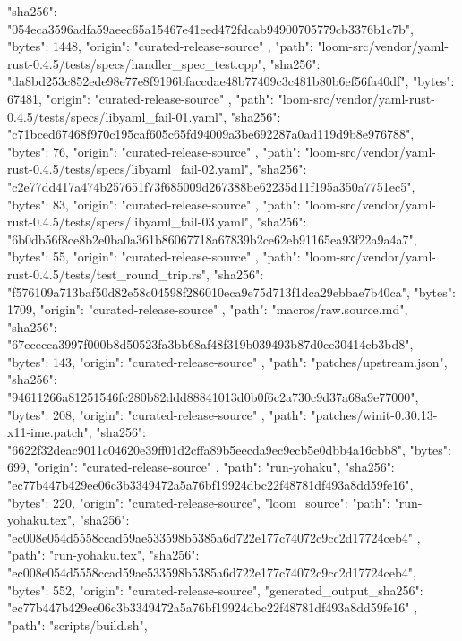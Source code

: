 {{      "sha256": "054eca3596adfa59aeec65a15467e41eed472fdcab94900705779cb3376b1c7b",
      "bytes": 1448,
      "origin": "curated-release-source"
    },
    {
      "path": "loom-src/vendor/yaml-rust-0.4.5/tests/specs/handler_spec_test.cpp",
      "sha256": "da8bd253c852ede98e77e8f9196bfaccdae48b77409c3c481b80b6ef56fa40df",
      "bytes": 67481,
      "origin": "curated-release-source"
    },
    {
      "path": "loom-src/vendor/yaml-rust-0.4.5/tests/specs/libyaml_fail-01.yaml",
      "sha256": "c71bced67468f970c195caf605c65fd94009a3be692287a0ad119d9b8e976788",
      "bytes": 76,
      "origin": "curated-release-source"
    },
    {
      "path": "loom-src/vendor/yaml-rust-0.4.5/tests/specs/libyaml_fail-02.yaml",
      "sha256": "c2e77dd417a474b257651f73f685009d267388be62235d11f195a350a7751ec5",
      "bytes": 83,
      "origin": "curated-release-source"
    },
    {
      "path": "loom-src/vendor/yaml-rust-0.4.5/tests/specs/libyaml_fail-03.yaml",
      "sha256": "6b0db56f8ce8b2e0ba0a361b86067718a67839b2ce62eb91165ea93f22a9a4a7",
      "bytes": 55,
      "origin": "curated-release-source"
    },
    {
      "path": "loom-src/vendor/yaml-rust-0.4.5/tests/test_round_trip.rs",
      "sha256": "f576109a713baf50d82e58c04598f286010eca9e75d713f1dca29ebbae7b40ca",
      "bytes": 1709,
      "origin": "curated-release-source"
    },
    {
      "path": "macros/raw.source.md",
      "sha256": "67ececca3997f000b8d50523fa3bb68af48f319b039493b87d0ce30414cb3bd8",
      "bytes": 143,
      "origin": "curated-release-source"
    },
    {
      "path": "patches/upstream.json",
      "sha256": "94611266a81251546fc280b82ddd88841013d0b0f6c2a730c9d37a68a9e77000",
      "bytes": 208,
      "origin": "curated-release-source"
    },
    {
      "path": "patches/winit-0.30.13-x11-ime.patch",
      "sha256": "6622f32deac9011c04620e39ff01d2cffa89b5eecda9ec9ecb5e0dbb4a16cbb8",
      "bytes": 699,
      "origin": "curated-release-source"
    },
    {
      "path": "run-yohaku",
      "sha256": "ec77b447b429ee06c3b3349472a5a76bf19924dbc22f48781df493a8dd59fe16",
      "bytes": 220,
      "origin": "curated-release-source",
      "loom_source": {
        "path": "run-yohaku.tex",
        "sha256": "ec008e054d5558ccad59ae533598b5385a6d722e177c74072c9cc2d17724ceb4"
      }
    },
    {
      "path": "run-yohaku.tex",
      "sha256": "ec008e054d5558ccad59ae533598b5385a6d722e177c74072c9cc2d17724ceb4",
      "bytes": 552,
      "origin": "curated-release-source",
      "generated_output_sha256": "ec77b447b429ee06c3b3349472a5a76bf19924dbc22f48781df493a8dd59fe16"
    },
    {
      "path": "scripts/build.sh",
}}
